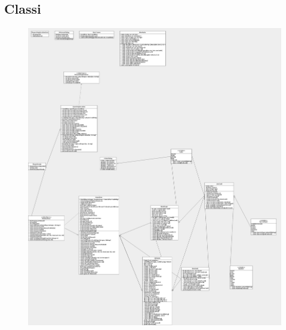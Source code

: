 \documentclass[10pt,a4paper]{article}
\begin{document}
\subsection{Classi}

\begin{figure}[H]

\includegraphics[width=16cm, keepaspectratio]{unogame-sd.png}

\end{figure}
\end{document}
